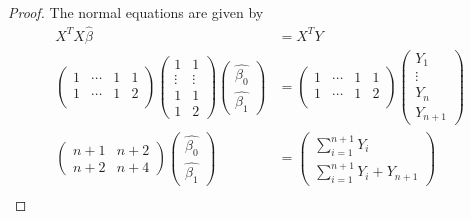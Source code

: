 \documentclass[12pt]{article}
\begin{document}
\begin{enumerate}[leftmargin=0cm,itemindent=.5cm,labelwidth=\itemindent,labelsep=0cm,align=left]
\begin{enumerate}
\begin{proof}
\noindent The normal equations are given by 
\begin{align*}
X^T X \hat{\beta} &= X^T Y \\
\begin{pmatrix}						%
1 & \cdots & 1 & 1 \\ 
1 & \cdots & 1 & 2 \\ 
\end{pmatrix}
\begin{pmatrix}						%
1 & 1 \\ 
\vdots & \vdots \\ 
1 & 1 \\ 
1 & 2
\end{pmatrix}
\begin{pmatrix}						%
\hat{\beta_0} \\ 
\hat{\beta_1}
\end{pmatrix}
&= \begin{pmatrix}						%
1 & \cdots & 1 & 1 \\ 
1 & \cdots & 1 & 2 \\ 
\end{pmatrix}
\begin{pmatrix}						%
Y_1 \\
\vdots \\
Y_n \\
Y_{n+1}
\end{pmatrix}
\\									%
\begin{pmatrix}						%
n+1 & n+2 \\
n+2 & n+4
\end{pmatrix}
\begin{pmatrix}						%
\hat{\beta_0} \\ 
\hat{\beta_1}
\end{pmatrix}
&=
\begin{pmatrix}						%
\sum\limits_{i=1}^{n+1} Y_i \\
\sum\limits_{i=1}^{n+1} Y_i + Y_{n+1}
\end{pmatrix} \\
\end{align*}


\end{proof}
\end{enumerate}
\end{enumerate}
\end{document}
